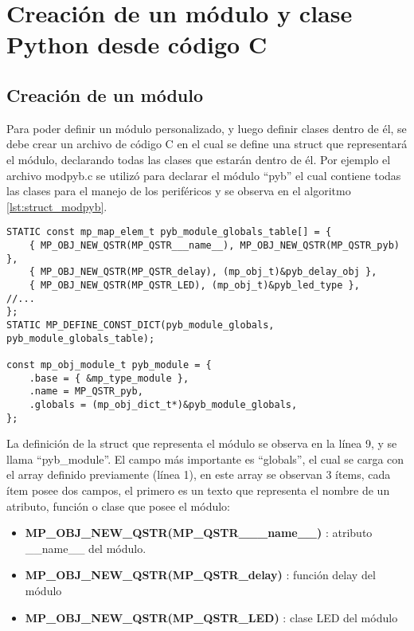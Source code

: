 
\chapter{Creación de un módulo y clase Python desde código C} %

\label{AppendixA} %

\section{Creación de un módulo}

Para poder definir un módulo personalizado, y luego definir clases dentro de él, se debe crear un archivo de código C en el cual se define una struct que representará el módulo, declarando todas las clases que estarán dentro de él. Por ejemplo el archivo modpyb.c se utilizó para declarar el módulo “pyb” el cual contiene todas las clases para el manejo de los periféricos y se observa en el algoritmo \ref{lst:struct_modpyb}.

\begin{lstlisting}[label={lst:struct_modpyb},caption=Estructura donde se definen los atributos\, funciones y clases del módulo.] 
STATIC const mp_map_elem_t pyb_module_globals_table[] = {
    { MP_OBJ_NEW_QSTR(MP_QSTR___name__), MP_OBJ_NEW_QSTR(MP_QSTR_pyb) },
    { MP_OBJ_NEW_QSTR(MP_QSTR_delay), (mp_obj_t)&pyb_delay_obj },
    { MP_OBJ_NEW_QSTR(MP_QSTR_LED), (mp_obj_t)&pyb_led_type },
//...
};
STATIC MP_DEFINE_CONST_DICT(pyb_module_globals, pyb_module_globals_table);

const mp_obj_module_t pyb_module = {
    .base = { &mp_type_module },
    .name = MP_QSTR_pyb,
    .globals = (mp_obj_dict_t*)&pyb_module_globals,
};
\end{lstlisting}

La definición de la struct que representa el módulo se observa en la línea 9, y se llama “pyb\_module”. El campo más importante es “globals”, el cual se carga con el array definido previamente (línea 1), en este array se observan 3 ítems, cada ítem posee dos campos, el primero es un texto que representa el nombre de un atributo, función o clase que posee el módulo:
\begin{itemize}
\item \textbf{MP\_OBJ\_NEW\_QSTR(MP\_QSTR\_\_\_name\_\_)} : atributo \_\_name\_\_ del módulo.
\item \textbf{MP\_OBJ\_NEW\_QSTR(MP\_QSTR\_delay)} : función delay del módulo
\item \textbf{MP\_OBJ\_NEW\_QSTR(MP\_QSTR\_LED)} : clase LED del módulo
\end{itemize}

